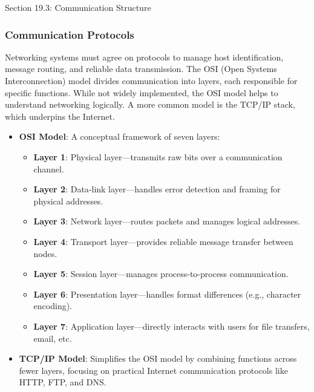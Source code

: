 \begin{notes}{Section 19.3: Communication Structure}
    \subsubsection*{Communication Protocols}
    
    Networking systems must agree on protocols to manage host identification, message routing, and reliable data transmission. The OSI (Open Systems Interconnection) model divides communication into 
    layers, each responsible for specific functions. While not widely implemented, the OSI model helps to understand networking logically. A more common model is the TCP/IP stack, which underpins the Internet.
    
    \begin{highlight}
    
        \begin{itemize}
            \item \textbf{OSI Model}: A conceptual framework of seven layers:
                \begin{itemize}
                    \item \textbf{Layer 1}: Physical layer—transmits raw bits over a communication channel.
                    \item \textbf{Layer 2}: Data-link layer—handles error detection and framing for physical addresses.
                    \item \textbf{Layer 3}: Network layer—routes packets and manages logical addresses.
                    \item \textbf{Layer 4}: Transport layer—provides reliable message transfer between nodes.
                    \item \textbf{Layer 5}: Session layer—manages process-to-process communication.
                    \item \textbf{Layer 6}: Presentation layer—handles format differences (e.g., character encoding).
                    \item \textbf{Layer 7}: Application layer—directly interacts with users for file transfers, email, etc.
                \end{itemize}
            \item \textbf{TCP/IP Model}: Simplifies the OSI model by combining functions across fewer layers, focusing on practical Internet communication protocols like HTTP, FTP, and DNS.
        \end{itemize}
    
    \end{highlight}
    

\end{notes}

